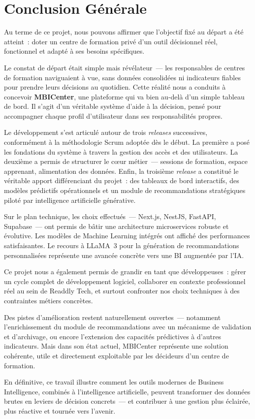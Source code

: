 \chapter*{Conclusion Générale}

Au terme de ce projet, nous pouvons affirmer que l'objectif fixé au départ a été atteint~: doter
un centre de formation privé d'un outil décisionnel réel, fonctionnel et adapté à ses besoins
spécifiques.

Le constat de départ était simple mais révélateur~--- les responsables de centres de formation
naviguaient à vue, sans données consolidées ni indicateurs fiables pour prendre leurs décisions
au quotidien. Cette réalité nous a conduits à concevoir \textbf{MBICenter}, une plateforme qui
va bien au-delà d'un simple tableau de bord. Il s'agit d'un véritable système d'aide à la
décision, pensé pour accompagner chaque profil d'utilisateur dans ses responsabilités propres.

Le développement s'est articulé autour de trois \textit{releases} successives, conformément à
la méthodologie Scrum adoptée dès le début. La première a posé les fondations du système à
travers la gestion des accès et des utilisateurs. La deuxième a permis de structurer le c\oe{}ur
métier~--- sessions de formation, espace apprenant, alimentation des données. Enfin, la troisième
\textit{release} a constitué le véritable apport différenciant du projet~: des tableaux de bord
interactifs, des modèles prédictifs opérationnels et un module de recommandations stratégiques
piloté par intelligence artificielle générative.

Sur le plan technique, les choix effectués~--- Next.js, NestJS, FastAPI, Supabase~--- ont permis
de bâtir une architecture microservices robuste et évolutive. Les modèles de Machine Learning
intégrés ont affiché des performances satisfaisantes. Le recours à LLaMA~3 pour la
génération de recommandations personnalisées représente une avancée concrète vers une BI
augmentée par l'IA.

Ce projet nous a également permis de grandir en tant que développeuses~: gérer un cycle complet
de développement logiciel, collaborer en contexte professionnel réel au sein de Readdly Tech,
et surtout confronter nos choix techniques à des contraintes métiers concrètes.

Des pistes d'amélioration restent naturellement ouvertes~--- notamment l'enrichissement du module
de recommandations avec un mécanisme de validation et d'archivage, ou encore l'extension des
capacités prédictives à d'autres indicateurs. Mais dans son état actuel, MBICenter représente
une solution cohérente, utile et directement exploitable par les décideurs d'un centre de
formation.

En définitive, ce travail illustre comment les outils modernes de Business Intelligence,
combinés à l'intelligence artificielle, peuvent transformer des données brutes en leviers de
décision concrets~--- et contribuer à une gestion plus éclairée, plus réactive et tournée vers
l'avenir.
